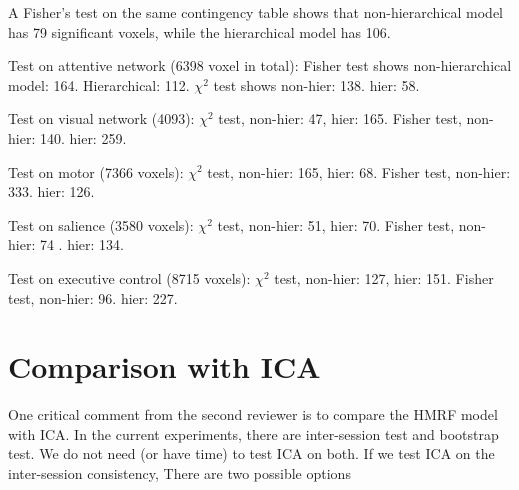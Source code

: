 \documentclass[12pt]{article}
\begin{document}
A Fisher's test on the same contingency table shows that non-hierarchical model
has 79 significant voxels, while the hierarchical model has 106.


Test on attentive network (6398 voxel in total): Fisher test shows
non-hierarchical model: 164. Hierarchical: 112. $\chi^2$ test shows non-hier:
138. hier: 58.

Test on visual network (4093): $\chi^2$ test, non-hier: 47, hier: 165. Fisher
test, non-hier: 140. hier: 259.

Test on motor (7366 voxels): $\chi^2$ test, non-hier: 165, hier: 68. Fisher
test, non-hier: 333. hier: 126.

Test on salience (3580 voxels): $\chi^2$ test, non-hier: 51, hier: 70. Fisher
test, non-hier: 74 . hier: 134.

Test on executive control (8715 voxels): $\chi^2$ test, non-hier: 127, hier: 151. Fisher
test, non-hier: 96. hier: 227.




\section{Comparison with ICA}
One critical comment from the second reviewer is to compare the HMRF model with
ICA. In the current experiments, there are inter-session test and bootstrap
test. We do not need (or have time) to test ICA on both. If we test ICA on the
inter-session consistency, There are two possible options
\end{document}
